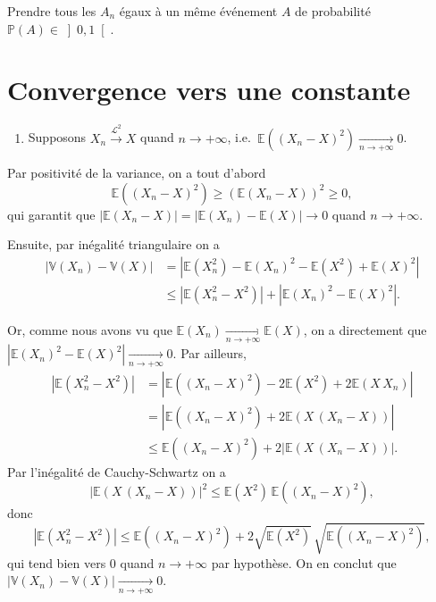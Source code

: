 \label{IV-answer-bc3}
Prendre tous les \(A_n\) égaux à un même événement \(A\) de probabilité
\(\mathbb{P}(A) \in \left]0,1\right[\).

\section{Convergence vers une
constante}\label{IV-convergence-vers-une-constante-1}

\label{IV-answer-cvtocst-l2}

\begin{enumerate}
\def\labelenumi{\arabic{enumi}.}
\tightlist
\item
  Supposons \(X_n \overset{\mathcal{L}^2}{\longrightarrow} X\) quand
  \(n\to+\infty\),
  i.e.~\(\mathbb{E}\left(\left(X_n - X\right)^2\right) \xrightarrow[n\to+\infty]{} 0\).
\end{enumerate}

Par positivité de la variance, on a tout d'abord
\[\mathbb{E}\left(\left(X_n - X\right)^2\right) \geq \left(\mathbb{E}\left(X_n-X\right)\right)^2 \geq 0,\]
qui garantit que
\(\left|\mathbb{E}\left(X_n-X\right)\right| = \left|\mathbb{E}(X_n) - \mathbb{E}(X)\right| \to 0\)
quand \(n\to+\infty\).

Ensuite, par inégalité triangulaire on a \begin{align*}
\left|\mathbb{V}\left(X_n\right) - \mathbb{V}\left(X\right)\right| &= \left|\mathbb{E}\left(X_n^2\right) - \mathbb{E}(X_n)^2 - \mathbb{E}\left(X^2\right) + \mathbb{E}(X)^2 \right|\\
& \leq \left|\mathbb{E}\left(X_n^2 - X^2\right)\right| + \left|\mathbb{E}(X_n)^2 - \mathbb{E}(X)^2\right|.
\end{align*}

Or, comme nous avons vu que
\(\mathbb{E}(X_n) \xrightarrow[n\to+\infty]{} \mathbb{E}(X)\), on a
directement que
\(\left|\mathbb{E}(X_n)^2 - \mathbb{E}(X)^2\right| \xrightarrow[n\to+\infty]{} 0\).
Par ailleurs, \begin{align*}
\left|\mathbb{E}\left(X_n^2 - X^2\right)\right| &= \left|\mathbb{E}\left( \left(X_n-X\right)^2 \right) - 2\mathbb{E}\left(X^2\right) + 2\mathbb{E}\left(X\,X_n\right)\right|\\
&= \left|\mathbb{E}\left( \left(X_n-X\right)^2 \right) + 2\mathbb{E}\left(X\,(X_n-X)\right)\right|\\
&\leq \mathbb{E}\left( \left(X_n-X\right)^2 \right) + 2\left|\mathbb{E}\left(X\,(X_n-X)\right)\right|.
\end{align*} Par l'inégalité de Cauchy-Schwartz on a
\[\left|\mathbb{E}\left(X\,(X_n-X)\right)\right|^2 \leq \mathbb{E}\left(X^2\right)\,\mathbb{E}\left( \left(X_n-X\right)^2 \right),\]
donc
\[\left|\mathbb{E}\left(X_n^2 - X^2\right)\right| \leq \mathbb{E}\left( \left(X_n-X\right)^2 \right) + 2\sqrt{\mathbb{E}\left(X^2\right)}\,\sqrt{\mathbb{E}\left( \left(X_n-X\right)^2 \right)},\]
qui tend bien vers \(0\) quand \(n\to+\infty\) par hypothèse. On en
conclut que
\(\left|\mathbb{V}\left(X_n\right) - \mathbb{V}\left(X\right)\right|\xrightarrow[n\to+\infty]{} 0.\)

